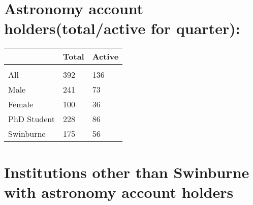 \documentclass{article}%
\begin{document}
\section{Astronomy account holders(total/active for quarter): }%

%
\begin{longtabu}{X[l] X[r] X[r]}%
\textbf{}&\textbf{Total}&\textbf{Active}\\%
\hline%
&&\\%
All&392&136\\%
\hline%
Male&241&73\\%
\hline%
Female&100&36\\%
\hline%
PhD Student&228&86\\%
\hline%
Swinburne&175&56\\%
\hline%
\end{longtabu}%
\section{Institutions other than Swinburne with astronomy account holders}%
\end{document}
